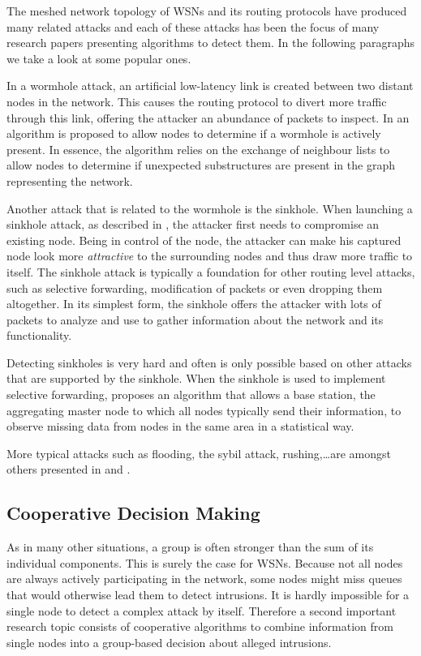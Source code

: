 \documentclass[conference]{IEEEtran}
\begin{document}
The meshed network topology of WSNs and its routing protocols have produced
many related attacks and each of these attacks has been the focus of many
research papers presenting algorithms to detect them. In the following
paragraphs we take a look at some popular ones.

In a wormhole attack, an artificial low-latency link is created between two
distant nodes in the network. This causes the routing protocol to divert more
traffic through this link, offering the attacker an abundance of packets to
inspect. In \cite{maheshwari2007detecting} an algorithm is proposed to allow
nodes to determine if a wormhole is actively present. In essence, the algorithm
relies on the exchange of neighbour lists to allow nodes to determine if
unexpected substructures are present in the graph representing the network.

Another attack that is related to the wormhole is the sinkhole. When launching
a sinkhole attack, as described in \cite{krontiris2008launching}, the attacker
first needs to compromise an existing node. Being in control of the node, the
attacker can make his captured node look more \emph{attractive} to the
surrounding nodes and thus draw more traffic to itself. The sinkhole attack is
typically a foundation for other routing level attacks, such as selective
forwarding, modification of packets or even dropping them altogether. In its
simplest form, the sinkhole offers the attacker with lots of packets to analyze
and use to gather information about the network and its functionality.

Detecting sinkholes is very hard and often is only possible based on other
attacks that are supported by the sinkhole. When the sinkhole is used to
implement selective forwarding, \cite{ngai2006intruder} proposes an algorithm
that allows a base station, the aggregating master node to which all nodes
typically send their information, to observe missing data from nodes in the
same area in a statistical way.

More typical attacks such as flooding, the sybil attack, rushing,\dots are
amongst others presented in \cite{wood2002denial} and \cite{djenouri2005survey}.

\subsection{Cooperative Decision Making}
\label{subsection:coorperative}

As in many other situations, a group is often stronger than the sum of its
individual components. This is surely the case for WSNs. Because not all nodes
are always actively participating in the network, some nodes might miss queues
that would otherwise lead them to detect intrusions. It is hardly impossible
for a single node to detect a complex attack by itself. Therefore a second
important research topic consists of cooperative algorithms to combine
information from single nodes into a group-based decision about alleged
intrusions.
\end{document}
